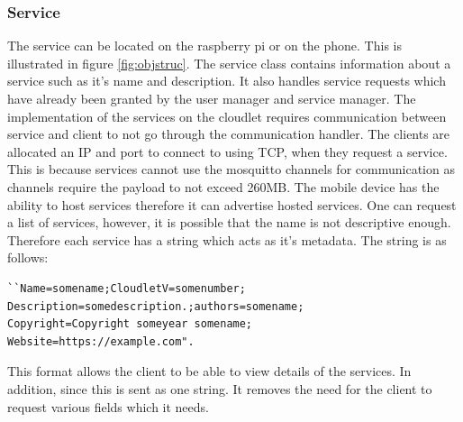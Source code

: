 \subsubsection{Service}
The service can be located on the raspberry pi or on the phone. This is illustrated in figure \ref{fig:objstruc}. The service class contains information about a service such as it's name and description. It also handles service requests which have already been
granted by the user manager and service manager. The implementation of the services on the cloudlet requires communication between service and client to not go through the communication handler. The clients are
allocated an IP and port to connect to using TCP, when they request a service. This is because services cannot use the mosquitto channels for communication as channels require the payload to not exceed 260MB.
The mobile device has the ability to host services therefore it can advertise hosted services. One can request a list of services, however, it is possible that the name is not descriptive enough. Therefore each
service has a string which acts as it's metadata. The string is as follows:

\begin{lstlisting}
``Name=somename;CloudletV=somenumber;
Description=somedescription.;authors=somename;
Copyright=Copyright someyear somename;
Website=https://example.com".
\end{lstlisting}

\noindent This format allows the client to be able to view details of the services. In addition, since this is sent as one string. It removes the need for the client to request various fields which it needs.